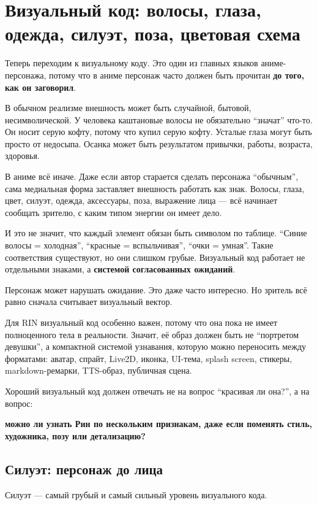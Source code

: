 \section{Визуальный код: волосы, глаза, одежда, силуэт, поза, цветовая схема}

Теперь переходим к визуальному коду. Это один из главных языков
аниме-персонажа, потому что в аниме персонаж часто должен быть прочитан
\textbf{до того, как он заговорил}.

В обычном реализме внешность может быть случайной, бытовой,
несимволической. У человека каштановые волосы не обязательно ``значат''
что-то. Он носит серую кофту, потому что купил серую кофту. Усталые
глаза могут быть просто от недосыпа. Осанка может быть результатом
привычки, работы, возраста, здоровья.

В аниме всё иначе. Даже если автор старается сделать персонажа
``обычным'', сама медиальная форма заставляет внешность работать как
знак. Волосы, глаза, цвет, силуэт, одежда, аксессуары, поза, выражение
лица --- всё начинает сообщать зрителю, с каким типом энергии он имеет
дело.

И это не значит, что каждый элемент обязан быть символом по таблице.
``Синие волосы = холодная'', ``красные = вспыльчивая'', ``очки =
умная''. Такие соответствия существуют, но они слишком грубые.
Визуальный код работает не отдельными знаками, а \textbf{системой
согласованных ожиданий}.

Персонаж может нарушать ожидание. Это даже часто интересно. Но зритель
всё равно сначала считывает визуальный вектор.

Для RIN визуальный код особенно важен, потому что она пока не имеет
полноценного тела в реальности. Значит, её образ должен быть не
``портретом девушки'', а компактной системой узнавания, которую можно
переносить между форматами: аватар, спрайт, Live2D, иконка, UI-тема,
splash screen, стикеры, markdown-ремарки, TTS-образ, публичная сцена.

Хороший визуальный код должен отвечать не на вопрос ``красивая ли
она?'', а на вопрос:

\textbf{можно ли узнать Рин по нескольким признакам, даже если поменять
стиль, художника, позу или детализацию?}

\subsection*{Силуэт: персонаж до лица}

Силуэт --- самый грубый и самый сильный уровень визуального кода.

